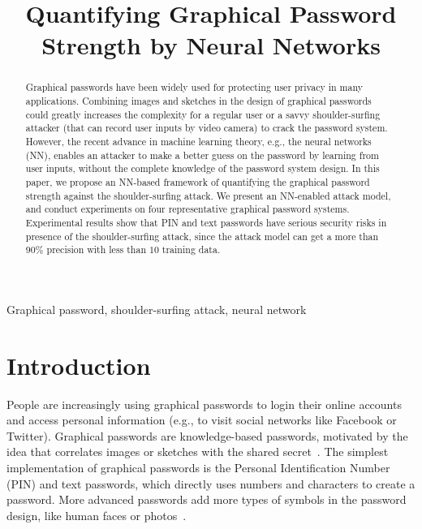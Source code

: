 \documentclass{article}
\title{Quantifying Graphical Password Strength by Neural Networks}
\begin{document}
  \maketitle
  \begin{abstract}
  Graphical passwords have been widely used for protecting user privacy in many applications. Combining images and sketches in the design of graphical passwords could greatly increases the complexity for a regular user or a savvy shoulder-surfing attacker (that can record user inputs by video camera) to crack the password system. However, the recent advance in machine learning theory, e.g., the neural networks (NN), enables an attacker to make a better guess on the password by learning from user inputs, without the complete knowledge of the password system design. In this paper, we propose an NN-based framework of quantifying the graphical password strength against the shoulder-surfing attack. We present an NN-enabled attack model, and conduct experiments on four representative graphical password systems. Experimental results show that PIN and text passwords have serious security risks in presence of the shoulder-surfing attack, since the attack model can get a more than $90\%$ precision with less than $10$ training data.
  \end{abstract}
  \begin{keywords}
  Graphical password, shoulder-surfing attack, neural network
  \end{keywords}
  \section{Introduction}
  \label{sec:intro}

People are increasingly using graphical passwords to login their online accounts and access personal information (e.g., to visit social networks like Facebook or Twitter). Graphical passwords are knowledge-based passwords, motivated by the idea that correlates images or sketches with the shared secret~\cite{DBLP:journals/csur/BiddleCO12}. The simplest implementation of graphical passwords is the Personal Identification Number (PIN) and text passwords, which directly uses numbers and characters to create a password. More advanced passwords add more types of symbols in the password design, like human faces or photos~\cite{Passfaces,DBLP:conf/uss/JermynMMRR99,DBLP:conf/soups/WiedenbeckWBBM05}.
\end{document}
